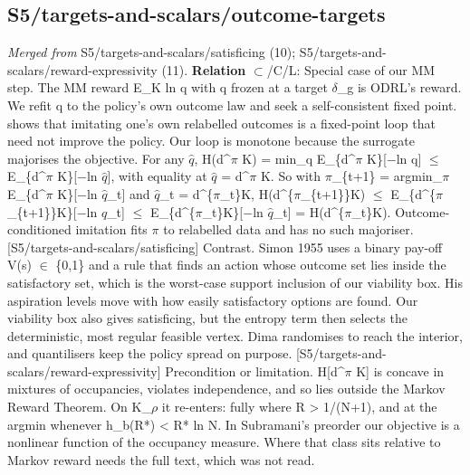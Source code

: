 \documentclass[10pt]{article}
\begin{document}
\subsection{S5/targets-and-scalars/outcome-targets}\label{node:S5-S5-targets-and-scalars-outcome-targets}
\textit{Merged from} S5/targets-and-scalars/satisficing (10); S5/targets-and-scalars/reward-expressivity (11). \textbf{Relation} $\subset$/\textsf{C}/\textsf{L}: Special case of our MM step. The MM reward E\_K ln q with q frozen at a target \ensuremath{\delta}\_g is ODRL's reward. We refit q to the policy's own outcome law and seek a self-consistent fixed point. \citet{Eysenbach-imitating22} shows that imitating one's own relabelled outcomes is a fixed-point loop that need not improve the policy. Our loop is monotone because the surrogate majorises the objective. For any \ensuremath{\hat{q}}, H(d\^{}\ensuremath{\pi} K) = min\_q E\_\{d\^{}\ensuremath{\pi} K\}[\ensuremath{-}ln q] \ensuremath{\leq} E\_\{d\^{}\ensuremath{\pi} K\}[\ensuremath{-}ln \ensuremath{\hat{q}}], with equality at \ensuremath{\hat{q}} = d\^{}\ensuremath{\pi} K. So with \ensuremath{\pi}\_\{t+1\} = argmin\_\ensuremath{\pi} E\_\{d\^{}\ensuremath{\pi} K\}[\ensuremath{-}ln \ensuremath{\hat{q}}\_t] and \ensuremath{\hat{q}}\_t = d\^{}\{\ensuremath{\pi}\_t\}K, H(d\^{}\{\ensuremath{\pi}\_\{t+1\}\}K) \ensuremath{\leq} E\_\{d\^{}\{\ensuremath{\pi}\_\{t+1\}\}K\}[\ensuremath{-}ln \ensuremath{\hat{q}}\_t] \ensuremath{\leq} E\_\{d\^{}\{\ensuremath{\pi}\_t\}K\}[\ensuremath{-}ln \ensuremath{\hat{q}}\_t] = H(d\^{}\{\ensuremath{\pi}\_t\}K). Outcome-conditioned imitation fits \ensuremath{\pi} to relabelled data and has no such majoriser. [S5/targets-and-scalars/satisficing] Contrast. Simon 1955 uses a binary pay-off V(s) \ensuremath{\in} \{0,1\} and a rule that finds an action whose outcome set lies inside the satisfactory set, which is the worst-case support inclusion of our viability box. His aspiration levels move with how easily satisfactory options are found. Our viability box also gives satisficing, but the entropy term then selects the deterministic, most regular feasible vertex. Dima randomises to reach the interior, and quantilisers keep the policy spread on purpose. [S5/targets-and-scalars/reward-expressivity] Precondition or limitation. H[d\^{}\ensuremath{\pi} K] is concave in mixtures of occupancies, violates independence, and so lies outside the Markov Reward Theorem. On K\_\ensuremath{\rho} it re-enters: fully where R \textgreater{} 1/(N+1), and at the argmin whenever h\_b(R*) \textless{} R* ln N. In Subramani's preorder our objective is a nonlinear function of the occupancy measure. Where that class sits relative to Markov reward needs the full text, which was not read.
\end{document}
